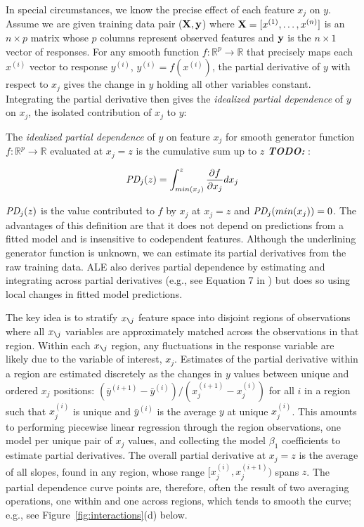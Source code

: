 \documentclass[smallextended]{svjour3}       %
\newcommand{\figref}[1]{Figure~\ref{#1}}
\newcommand{\todo}[1]{{\bf\em TODO:} {{\color{red}{#1}}}}
\newcommand{\xnj}{$x_{\texttt{\char`\\} j}$}
\renewcommand{\xi}{x^{(i)}}
\begin{document}
In special circumstances, we know the precise effect of each feature $x_j$ on $y$.  Assume we are given training data pair ($\bf X, y$) where ${\bf X} = [x^{(1)}, \ldots, x^{(n)}]$ is an $n \times p$ matrix whose $p$ columns represent observed features and ${\bf y}$ is the $n \times 1$ vector of responses. For any smooth function $f:\mathbb{R}^{p} \rightarrow \mathbb{R}$ that precisely maps each $\xi$ vector to response $y^{(i)}$, ${y^{(i)}} = f(\xi)$, the partial derivative of $y$ with respect to $x_j$ gives the change in $y$ holding all other variables constant.  Integrating the partial derivative then gives the {\em idealized partial dependence}  of $y$ on $x_j$, the isolated contribution of $x_j$ to $y$:

 The {\em idealized partial dependence} of $y$ on feature $x_j$ for smooth generator function $f:\mathbb{R}^{p} \rightarrow \mathbb{R}$ evaluated at $x_j = z$ is the cumulative sum up to $z$ \todo{do we need to say that the partial derivative is continuous also?}:\vspace{-2mm}

\begin{equation}\label{eq:pd}
\text{\it PD}_j(z) = \int_{min(x_j)}^z \frac{\partial f}{\partial x_j} dx_j
\end{equation}\vspace{-2mm}

$\text{\it PD}_j(z)$ is the value contributed to $f$ by $x_j$ at $x_j = z$ and $\text{\it PD}_j(min(x_j))=0$. The advantages of this definition are that it does not depend on predictions from a fitted model and is insensitive to codependent features.  Although the underlining generator function is unknown, we can estimate its partial derivatives from the raw training data. ALE also derives partial dependence by estimating and integrating across partial derivatives (e.g., see Equation 7 in \citep{ALE}) but does so using local changes in fitted model predictions.


The key idea is to stratify \xnj{} feature space into disjoint regions of observations where all \xnj{} variables are approximately matched across the observations in that region. Within each \xnj{} region, any fluctuations in the response variable are likely due to the variable of interest, $x_j$.  Estimates of the partial derivative within a region are estimated discretely as the changes in $y$ values between unique and ordered $x_j$ positions:  $(\bar{y}^{(i+1)} - \bar{y}^{(i)})/(x_j^{(i+1)} - x_j^{(i)})$ for all $i$ in a region such that $x_j^{(i)}$ is unique and $\bar{y}^{(i)}$ is the average $y$ at unique $x_j^{(i)}$.  This amounts to performing piecewise linear regression through the region observations, one model per unique pair of $x_j$ values, and collecting the model $\beta_1$ coefficients to estimate partial derivatives. The overall partial derivative at $x_j=z$ is the average of all slopes, found in any region, whose range $[x_j^{(i)},x_j^{(i+1)})$ spans $z$. The partial dependence curve points are, therefore, often the result of two averaging operations, one within and one across regions, which tends to smooth the curve; e.g., see \figref{fig:interactions}(d) below.
\end{document}
